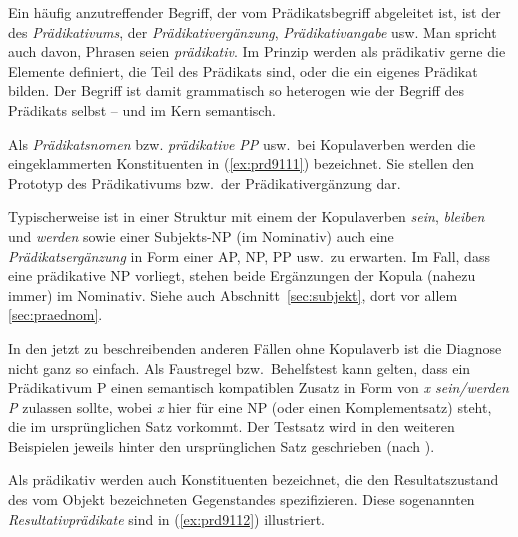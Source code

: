 Ein häufig anzutreffender Begriff, der vom Prädikatsbegriff abgeleitet ist, ist der des \textit{Prädikativums}, der \textit{Prädikativergänzung}, \textit{Prädikativangabe} usw.
Man spricht auch davon, Phrasen seien \textit{prädikativ}.
Im Prinzip werden als prädikativ gerne die Elemente definiert, die Teil des Prädikats sind, oder die ein eigenes Prädikat bilden.
Der Begriff ist damit grammatisch so heterogen wie der Begriff des Prädikats selbst -- und im Kern semantisch.


Als \textit{Prädikatsnomen} bzw. \textit{prädikative PP} usw.\ bei Kopulaverben werden die eingeklammerten Konstituenten in (\ref{ex:prd9111}) bezeichnet.
Sie stellen den Prototyp des Prädikativums bzw.\ der Prädikativergänzung dar.

\begin{exe}
  \ex\label{ex:prd9111} 
  \begin{xlist}
  \end{xlist}
\end{exe}

Typischerweise ist in einer Struktur mit einem der Kopulaverben \textit{sein}, \textit{bleiben} und \textit{werden} sowie einer Subjekts-NP (im Nominativ) auch eine \textit{Prädikatsergänzung} in Form einer AP, NP, PP usw.\ zu erwarten.
Im Fall, dass eine prädikative NP vorliegt, stehen beide Ergänzungen der Kopula (nahezu immer) im Nominativ.
Siehe auch Abschnitt~\ref{sec:subjekt}, dort vor allem \ref{sec:praednom}.

In den jetzt zu beschreibenden anderen Fällen ohne Kopulaverb ist die Diagnose nicht ganz so einfach.
Als Faustregel bzw.\ Behelfstest kann gelten, dass ein Prädikativum P einen semantisch kompatiblen Zusatz in Form von \textit{x sein/werden P} zulassen sollte, wobei \textit{x} hier für eine NP (oder einen Komplementsatz) steht, die im ursprünglichen Satz vorkommt.
Der Testsatz wird in den weiteren Beispielen jeweils hinter den ursprünglichen Satz geschrieben (nach \Folgt).

Als prädikativ werden auch Konstituenten bezeichnet, die den Resultatszustand des vom Objekt bezeichneten Gegenstandes spezifizieren.
Diese sogenannten \textit{Resultativprädikate} sind in (\ref{ex:prd9112}) illustriert.

